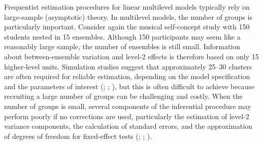 \documentclass[
  letterpaper,
  11pt,
  english,
  singlespacing,
  headsepline,
  openany]{MastersDoctoralThesis}
\begin{document}
Frequentist estimation procedures for linear multilevel models typically
rely on large-sample (asymptotic) theory. In multilevel models, the
number of groups is particularly important. Consider again the musical
self-concept study with 150 students nested in 15 ensembles. Although
150 participants may seem like a reasonably large sample, the number of
ensembles is still small. Information about between-ensemble variation
and level-2 effects is therefore based on only 15 higher-level units.
Simulation studies suggest that approximately 25--30 clusters are often
required for reliable estimation, depending on the model specification
and the parameters of interest (; ;
), but this
is often difficult to achieve because recruiting a large number of
groups can be challenging and costly. When the number of groups is
small, several components of the inferential procedure may perform
poorly if no corrections are used, particularly the estimation of
level-2 variance components, the calculation of standard errors, and the
approximation of degrees of freedom for fixed-effect tests
(; ; ).
\end{document}
